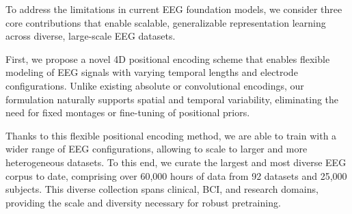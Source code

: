 \documentclass{article}
\begin{document}


To address the limitations in current EEG foundation models, we consider three core contributions that enable scalable, generalizable representation learning across diverse, large-scale EEG datasets. 

First, we propose a novel 4D positional encoding scheme that enables flexible modeling of EEG signals with varying temporal lengths and electrode configurations. Unlike existing absolute or convolutional encodings, our formulation naturally supports spatial and temporal variability, eliminating the need for fixed montages or fine-tuning of positional priors.

Thanks to this flexible positional encoding method, we are able to train with a wider range of EEG configurations, allowing to scale to larger and more heterogeneous datasets. To this end, we curate the largest and most diverse EEG corpus to date, comprising over 60,000 hours of data from 92 datasets and 25,000 subjects. This diverse collection spans clinical, BCI, and research domains, providing the scale and diversity necessary for robust pretraining.
\end{document}
